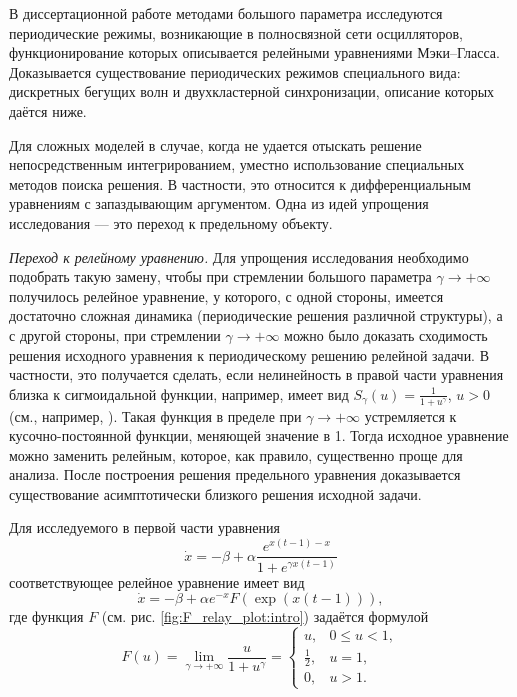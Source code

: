 В диссертационной работе методами большого параметра исследуются периодические режимы, возникающие в полносвязной сети осцилляторов, функционирование которых описывается релейными уравнениями Мэки--Гласса. Доказывается существование периодических режимов специального вида: дискретных бегущих волн и двухкластерной синхронизации, описание которых даётся ниже.

{\methods} Для сложных моделей в случае, когда не удается отыскать решение непосредственным интегрированием, уместно использование специальных методов поиска решения. В частности, это относится к дифференциальным уравнениям с запаздывающим аргументом. Одна из идей упрощения исследования --- это переход к предельному объекту.

\textit{Переход к релейному уравнению.} Для упрощения исследования необходимо подобрать такую замену, чтобы при стремлении большого параметра $\gamma \to +\infty$ получилось релейное уравнение, у которого, с одной стороны, имеется достаточно сложная динамика (периодические решения различной структуры), а с другой стороны, при стремлении $\gamma \to +\infty$ можно было доказать сходимость решения исходного уравнения к периодическому решению релейной задачи. В частности, это получается сделать, если нелинейность в правой части уравнения близка к сигмоидальной функции, например, имеет вид $S_\gamma(u)=\frac{1}{1 + u^\gamma}$, $u > 0$ (см., например, \cite{Preobrazhenskaya2020, Glyzin2017, Krisztin2020, Bartha2021}). Такая функция в пределе при $\gamma\to+\infty$ устремляется к кусочно-постоянной функции, меняющей значение в 1. Тогда исходное уравнение можно заменить релейным, которое, как правило, существенно проще для анализа. После построения решения предельного уравнения доказывается существование асимптотически близкого решения исходной задачи.

Для исследуемого в первой части уравнения
\begin{equation}
\label{eq:intro:MG_norm1}
	\dot{x}=-\beta+\alpha\frac{e^{x(t-1)-x}}{1+e^{\gamma x(t-1)}}
\end{equation}
соответствующее релейное уравнение имеет вид
\[
\dot{x}=-\beta + \alpha e^{-x} F(\exp({x(t-1)})),
\]
где функция $F$ (см. рис. \ref{fig:F_relay_plot:intro}) задаётся формулой
\begin{equation}
	\label{eq:intro:F_relay}
	F(u)=\lim\limits_{\gamma\to +\infty}\frac{u}{1+u^{\gamma}} = 
	\begin{cases}
		u, & 0 \leq u < 1,\\
		\frac{1}{2}, & u = 1,\\
		0, & u > 1.
	\end{cases}
\end{equation}

